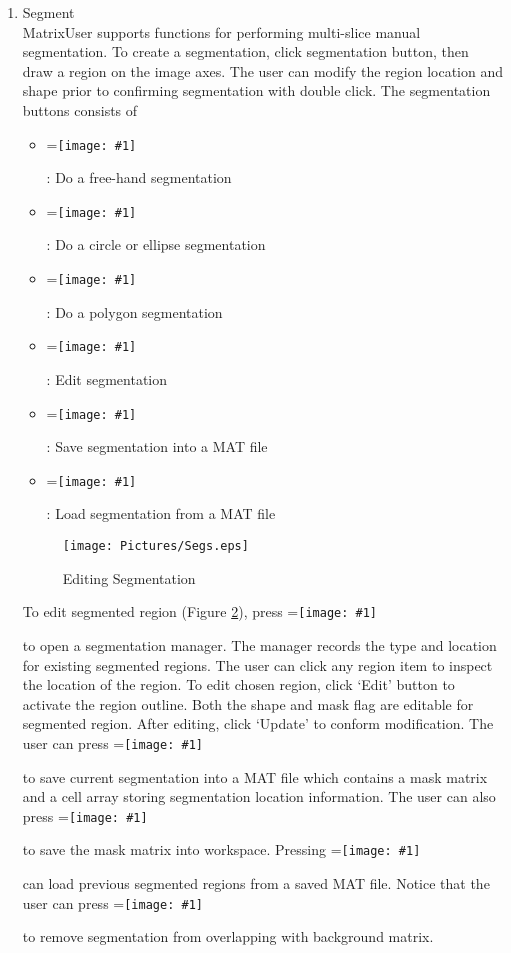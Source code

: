 \documentclass{article}%
\newcommand{\vcenteredinclude}[1]{
\begingroup
\setbox0=\hbox{\texttt{[image: \#1]}}
\parbox{\wd0}{\box0}\endgroup}
\begin{document}
\begin{enumerate}
	
	\begin{figure}[htbp]
		\centering
			\texttt{[image: Pictures/Hist.eps]}
		\caption{Histogram for One Image Slice}
		\label{fig:Hist}
	\end{figure}
	
	\item Segment \\
	
MatrixUser supports functions for performing multi-slice manual segmentation. To create a segmentation, click segmentation button, then draw a region on the image axes. The user can modify the region location and shape prior to confirming segmentation with double click. The segmentation buttons consists of
	
	\begin{itemize}
		\item \vcenteredinclude{Pictures/FreeSeg.eps} : Do a free-hand segmentation
		\item \vcenteredinclude{Pictures/CircleSeg.eps} : Do a circle or ellipse segmentation
		\item \vcenteredinclude{Pictures/PolygonSeg.eps} : Do a polygon segmentation
		\item \vcenteredinclude{Pictures/EditSeg.eps} : Edit segmentation
		\item \vcenteredinclude{Pictures/SaveSeg.eps} : Save segmentation into a MAT file
		\item \vcenteredinclude{Pictures/LoadSeg.eps} : Load segmentation from a MAT file
	\end{itemize}
	
	
\begin{figure}[htbp]
	\centering
		\texttt{[image: Pictures/Segs.eps]}
	\caption{Editing Segmentation}
	\label{fig:Segs}
\end{figure}	

To edit segmented region (Figure \ref{fig:Segs}), press \vcenteredinclude{Pictures/EditSeg.eps} to open a segmentation manager. The manager records the type and location for existing segmented regions. The user can click any region item to inspect the location of the region. To edit chosen region, click `Edit' button to activate the region outline. Both the shape and mask flag are editable for segmented region. After editing, click `Update' to conform modification. The user can press \vcenteredinclude{Pictures/SaveSeg.eps} to save current segmentation into a MAT file which contains a mask matrix and a cell array storing segmentation location information. The user can also press \vcenteredinclude{Pictures/Upload.eps} to save the mask matrix into workspace. Pressing \vcenteredinclude{Pictures/LoadSeg.eps} can load previous segmented regions from a saved MAT file. Notice that the user can press \vcenteredinclude{Pictures/Release.eps} to remove segmentation from overlapping with background matrix. 
	

\end{enumerate}
\end{document}
